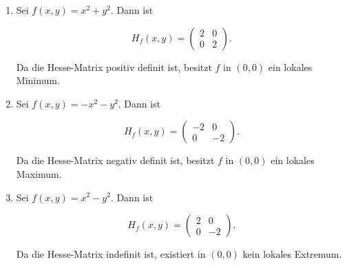 \begin{beispielbox}
\begin{enumerate}
    \item Sei \( f(x,y) = x^2 + y^2 \). Dann ist
    

\[
    H_f(x,y) = \begin{pmatrix} 2 & 0 \\ 0 & 2 \end{pmatrix}.
    \]


    Da die Hesse-Matrix positiv definit ist, besitzt \( f \) in \( (0,0) \) ein lokales Minimum.
    
    \item Sei \( f(x,y) = -x^2 - y^2 \). Dann ist
    

\[
    H_f(x,y) = \begin{pmatrix} -2 & 0 \\ 0 & -2 \end{pmatrix}.
    \]


    Da die Hesse-Matrix negativ definit ist, besitzt \( f \) in \( (0,0) \) ein lokales Maximum.
    
    \item Sei \( f(x,y) = x^2 - y^2 \). Dann ist
    

\[
    H_f(x,y) = \begin{pmatrix} 2 & 0 \\ 0 & -2 \end{pmatrix}.
    \]


    Da die Hesse-Matrix indefinit ist, existiert in \( (0,0) \) kein lokales Extremum.
\end{enumerate}
\end{beispielbox}
